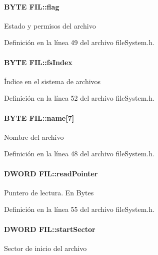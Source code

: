 \hypertarget{structFIL_ac409508881f5a16f2998ae675072b376}{
\paragraph[{flag}]{\setlength{\rightskip}{0pt plus 5cm}B\+Y\+T\+E F\+I\+L\+::flag}}\label{structFIL_ac409508881f5a16f2998ae675072b376}
Estado y permisos del archivo 

Definición en la línea 49 del archivo file\+System.\+h.

\hypertarget{structFIL_ab32bf8d0b478b2cef4942b2128f4f5f5}{
\paragraph[{fs\+Index}]{\setlength{\rightskip}{0pt plus 5cm}B\+Y\+T\+E F\+I\+L\+::fs\+Index}}\label{structFIL_ab32bf8d0b478b2cef4942b2128f4f5f5}
Índice en el sistema de archivos 

Definición en la línea 52 del archivo file\+System.\+h.

\hypertarget{structFIL_a21240fe08417eb46f794e67519bf4a58}{
\paragraph[{name}]{\setlength{\rightskip}{0pt plus 5cm}B\+Y\+T\+E F\+I\+L\+::name\mbox{[}7\mbox{]}}}\label{structFIL_a21240fe08417eb46f794e67519bf4a58}
Nombre del archivo 

Definición en la línea 48 del archivo file\+System.\+h.

\hypertarget{structFIL_ad0d1f48655e0e06936cb7883993afb1f}{
\paragraph[{read\+Pointer}]{\setlength{\rightskip}{0pt plus 5cm}D\+W\+O\+R\+D F\+I\+L\+::read\+Pointer}}\label{structFIL_ad0d1f48655e0e06936cb7883993afb1f}
Puntero de lectura. En Bytes 

Definición en la línea 55 del archivo file\+System.\+h.

\hypertarget{structFIL_a684d4d555f293b08b8396c35e20706d3}{
\paragraph[{start\+Sector}]{\setlength{\rightskip}{0pt plus 5cm}D\+W\+O\+R\+D F\+I\+L\+::start\+Sector}}\label{structFIL_a684d4d555f293b08b8396c35e20706d3}
Sector de inicio del archivo 

